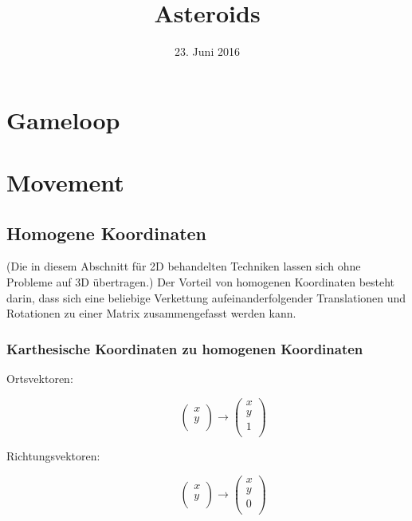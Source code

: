 \documentclass{article}
\title{Asteroids}
\date{23. Juni 2016}
\begin{document}
\maketitle

\section{Gameloop}

\section{Movement}
\subsection{Homogene Koordinaten}
(Die in diesem Abschnitt für 2D behandelten Techniken
lassen sich ohne Probleme auf 3D übertragen.)
Der Vorteil von homogenen Koordinaten besteht darin,
dass sich eine beliebige Verkettung
aufeinanderfolgender Translationen und Rotationen
zu einer Matrix zusammengefasst werden kann.
\subsubsection{Karthesische Koordinaten zu homogenen Koordinaten}
\begin{description}
 \item[Ortsvektoren:]
  \begin{equation}
   \left(\begin{array}{c}
    x \\
    y \\
   \end{array}\right)
   \rightarrow
   \left(\begin{array}{c}
    x \\
    y \\
    1 \\
   \end{array}\right)
  \end{equation}

 \item[Richtungsvektoren:]
  \begin{equation}
   \left(\begin{array}{c}
    x \\
    y \\
   \end{array}\right)
   \rightarrow
   \left(\begin{array}{c}
    x \\
    y \\
    0 \\
   \end{array}\right)
  \end{equation}
\end{description}
\end{document}
